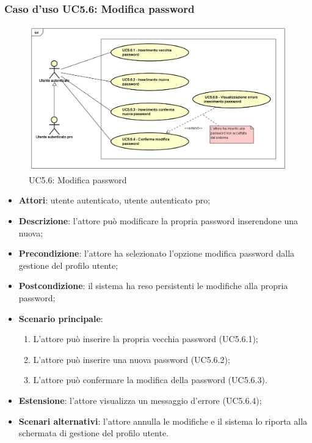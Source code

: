 \subsubsection{Caso d'uso UC5.6: Modifica password}
\label{UC5.6}
\begin{figure}[h]
	\centering
	\includegraphics[scale=0.5,keepaspectratio]{UML/UC5_6.png}
	\caption{UC5.6: Modifica password}
\end{figure}

\begin{itemize}
	\item \textbf{Attori}: utente autenticato, utente autenticato pro;
	\item \textbf{Descrizione}: l'attore può modificare la propria password inserendone una nuova;
	\item \textbf{Precondizione}:  l'attore ha selezionato l'opzione modifica password dalla gestione del profilo utente;
	\item \textbf{Postcondizione}: il sistema ha reso persistenti le modifiche alla propria password;
	\item \textbf{Scenario principale}:
	\begin{enumerate}
		\item L'attore può inserire la propria vecchia password (UC5.6.1);
		\item L'attore può inserire una nuova password (UC5.6.2);
		\item L'attore può confermare la modifica della password (UC5.6.3).
	\end{enumerate}
	\item \textbf{Estensione}: l'attore visualizza un messaggio d'errore (UC5.6.4);
	\item \textbf{Scenari alternativi}: l'attore annulla le modifiche e il sistema lo riporta alla schermata di gestione del profilo utente.
\end{itemize}


